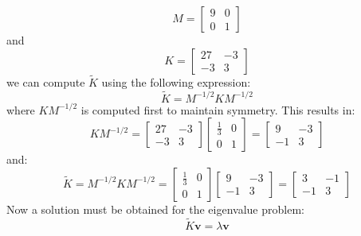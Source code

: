 \documentclass[12pt,letter]{article}
\begin{document}
\begin{example}
	\begin{equation}
		M = \begin{bmatrix} 9 & 0 \\  0  & 1 \end{bmatrix} 
	\end{equation}
	and 
	\begin{equation}
		 K = \begin{bmatrix} 27 & -3 \\    -3  & 3 \end{bmatrix}
	\end{equation}
	we can compute  $\widetilde{K}$ using the following expression:
	\begin{equation}
		 \widetilde{K}=M^{-1/2}KM^{-1/2}
	\end{equation}
	where $KM^{-1/2}$ is computed first to maintain symmetry. This results in:
	\begin{equation}
		 KM^{-1/2} =  \begin{bmatrix} 27 & -3 \\    -3  & 3 \end{bmatrix}  \begin{bmatrix} \frac{1}{3} & 0 \\    0  & 1 \end{bmatrix}= \begin{bmatrix} 9 & -3 \\    -1  & 3 \end{bmatrix}
	\end{equation}
	and:
	\begin{equation}
		  \widetilde{K}=M^{-1/2}KM^{-1/2} =  \begin{bmatrix} \frac{1}{3} & 0 \\    0  & 1 \end{bmatrix} \begin{bmatrix} 9 & -3 \\    -1  & 3 \end{bmatrix} =  \begin{bmatrix} 3 & -1\\  -1  & 3 \end{bmatrix} 
	\end{equation}
	Now a solution must be obtained for the eigenvalue problem:
	\begin{equation}
	\widetilde{K}\textbf{v} =  \lambda \textbf{v}
	\end{equation}
	

\end{example}
\end{document}
